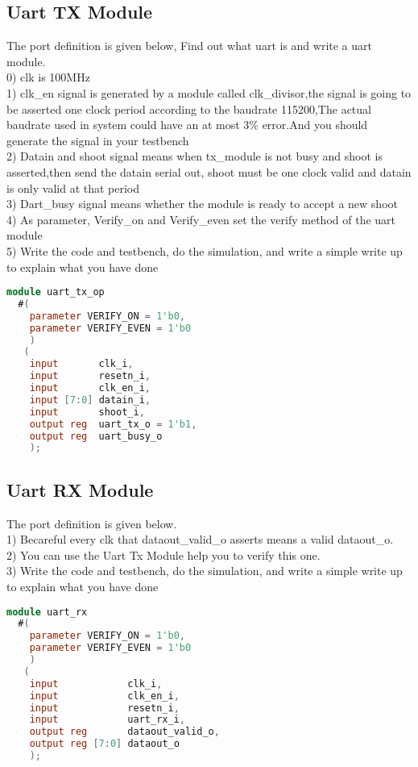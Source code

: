 \documentclass{article}
\begin{document}
\subsection{Uart TX Module}
The port definition is given below, Find out what uart is and write a uart module.\\
0) clk is 100MHz\\
1) clk\_en signal is generated by a module called clk\_divisor,the signal is going to be asserted one clock period according to the baudrate 115200,The actual baudrate used in system could have an at most 3\% error.And you should generate the signal in your testbench\\
2) Datain and shoot signal means when tx\_module is not busy and shoot is asserted,then send the datain serial out, shoot must be one clock valid and datain is only valid at that period\\
3) Dart\_busy signal means whether the module is ready to accept a new shoot\\
4) As parameter, Verify\_on and Verify\_even set the verify method of the uart module\\
5) Write the code and testbench, do the simulation, and write a simple write up to explain what you have done 


\begin{lstlisting}[language=Verilog]
module uart_tx_op
  #(
    parameter VERIFY_ON = 1'b0,
    parameter VERIFY_EVEN = 1'b0
    )
   (
    input       clk_i,
    input       resetn_i,
    input       clk_en_i, 
    input [7:0] datain_i,
    input       shoot_i,
    output reg  uart_tx_o = 1'b1,
    output reg  uart_busy_o
    );
\end{lstlisting}
\subsection{Uart RX Module}
The port definition is given below.\\
1) Becareful every clk that dataout\_valid\_o asserts means a valid dataout\_o.\\
2) You can use the Uart Tx Module help you to verify this one.\\
3) Write the code and testbench, do the simulation, and write a simple write up to explain what you have done 
\begin{lstlisting}[language=Verilog]
module uart_rx
  #(
    parameter VERIFY_ON = 1'b0,
    parameter VERIFY_EVEN = 1'b0
    )
   (
    input            clk_i,
    input            clk_en_i,
    input            resetn_i,
    input            uart_rx_i,
    output reg       dataout_valid_o,
    output reg [7:0] dataout_o 
    );
\end{lstlisting}
\end{document}
